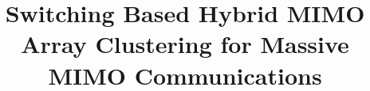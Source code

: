 \documentclass[journal]{IEEEtran}
\begin{document}
%
\title{Switching Based Hybrid MIMO Array Clustering for Massive MIMO Communications}




%




\end{document}
